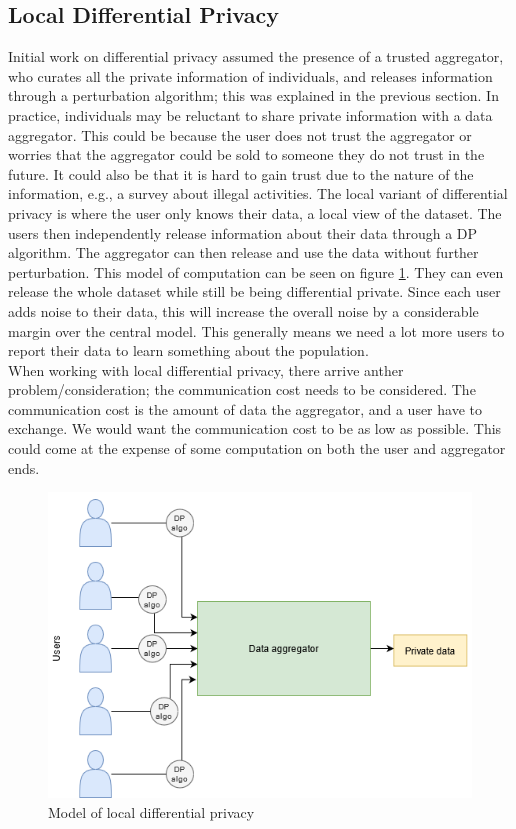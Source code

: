 \documentclass[11pt]{article}
\theoremstyle{definition}
\begin{document}
\subsection{Local Differential Privacy}\label{teo_local}
Initial work on differential privacy assumed the presence of a trusted aggregator, who curates all the private information of individuals, and releases information through a perturbation algorithm; this was explained in the previous section.  In practice, individuals may be reluctant to share private information with a data aggregator. This could be because the user does not trust the aggregator or worries that the aggregator could be sold to someone they do not trust in the future. It could also be that it is hard to gain trust due to the nature of the information, e.g., a survey about illegal activities. The local variant of differential privacy is where the user only knows their data, a local view of the dataset. The users then independently release information about their data through a DP algorithm. The aggregator can then release and use the data without further perturbation. This model of computation can be seen on figure \ref{fig:model_local_dp}. They can even release the whole dataset while still be being differential private. Since each user adds noise to their data, this will increase the overall noise by a considerable margin over the central model. This generally means we need a lot more users to report their data to learn something about the population. \\

When working with local differential privacy, there arrive anther problem/consideration; the communication cost needs to be considered. The communication cost is the amount of data the aggregator, and a user have to exchange. We would want the communication cost to be as low as possible. This could come at the expense of some computation on both the user and aggregator ends.
\begin{figure}[H]
    \centering
    \includegraphics[width = .8\textwidth]{figures/DP_local.png}
    \caption{Model of local differential privacy}
    \label{fig:model_local_dp}
\end{figure}
\end{document}
